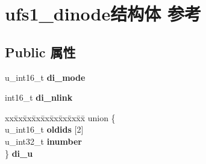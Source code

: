 \hypertarget{structufs1__dinode}{}\section{ufs1\+\_\+dinode结构体 参考}
\label{structufs1__dinode}
\subsection*{Public 属性}
\begin{DoxyCompactItemize}
\item 
\mbox{\label{structufs1__dinode_a1194f04404015f7da26bd1932773df6a}} 
u\+\_\+int16\+\_\+t {\bfseries di\+\_\+mode}
\item 
\mbox{\label{structufs1__dinode_a588b5e9341bb7c148047efff0ee220a7}} 
int16\+\_\+t {\bfseries di\+\_\+nlink}
\item 
\mbox{\label{structufs1__dinode_aaf4c73c0be060802c940c5175914cb69}} 
\begin{tabbing}
xx\=xx\=xx\=xx\=xx\=xx\=xx\=xx\=xx\=\kill
union \{\\
\>u\_int16\_t {\bfseries oldids} \mbox{[}2\mbox{]}\\
\>u\_int32\_t {\bfseries inumber}\\
\} {\bfseries di\_u}\\


\end{tabbing}
\end{DoxyCompactItemize}
